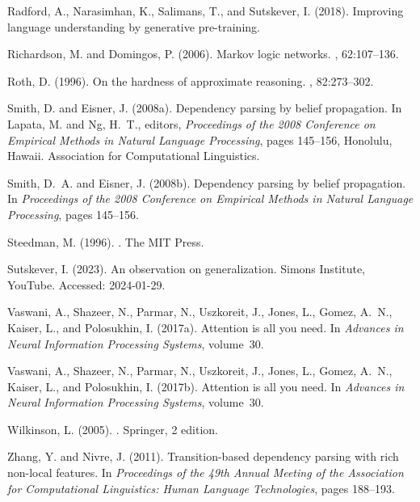\documentclass[11pt]{article}
\begin{document}
\begin{thebibliography}{}
    Radford, A., Narasimhan, K., Salimans, T., and Sutskever, I. (2018).
    \newblock Improving language understanding by generative pre-training.
    
    Richardson, M. and Domingos, P. (2006).
    \newblock Markov logic networks.
    , 62:107--136.
    
    Roth, D. (1996).
    \newblock On the hardness of approximate reasoning.
    , 82:273--302.
    
    Smith, D. and Eisner, J. (2008a).
    \newblock Dependency parsing by belief propagation.
    \newblock In Lapata, M. and Ng, H.~T., editors, {\em Proceedings of the 2008
      Conference on Empirical Methods in Natural Language Processing}, pages
      145--156, Honolulu, Hawaii. Association for Computational Linguistics.
    
    Smith, D.~A. and Eisner, J. (2008b).
    \newblock Dependency parsing by belief propagation.
    \newblock In {\em Proceedings of the 2008 Conference on Empirical Methods in
      Natural Language Processing}, pages 145--156.
    
    Steedman, M. (1996).
    .
    \newblock The MIT Press.
    
    Sutskever, I. (2023).
    \newblock An observation on generalization.
    \newblock Simons Institute, YouTube.
    \newblock Accessed: 2024-01-29.
    
    Vaswani, A., Shazeer, N., Parmar, N., Uszkoreit, J., Jones, L., Gomez, A.~N.,
      Kaiser, L., and Polosukhin, I. (2017a).
    \newblock Attention is all you need.
    \newblock In {\em Advances in Neural Information Processing Systems},
      volume~30.
    
    Vaswani, A., Shazeer, N., Parmar, N., Uszkoreit, J., Jones, L., Gomez, A.~N.,
      Kaiser, L., and Polosukhin, I. (2017b).
    \newblock Attention is all you need.
    \newblock In {\em Advances in Neural Information Processing Systems},
      volume~30.
    
    Wilkinson, L. (2005).
    .
    \newblock Springer, 2 edition.
    
    Zhang, Y. and Nivre, J. (2011).
    \newblock Transition-based dependency parsing with rich non-local features.
    \newblock In {\em Proceedings of the 49th Annual Meeting of the Association for
      Computational Linguistics: Human Language Technologies}, pages 188--193.
    
    \end{thebibliography}
    
\end{document}
